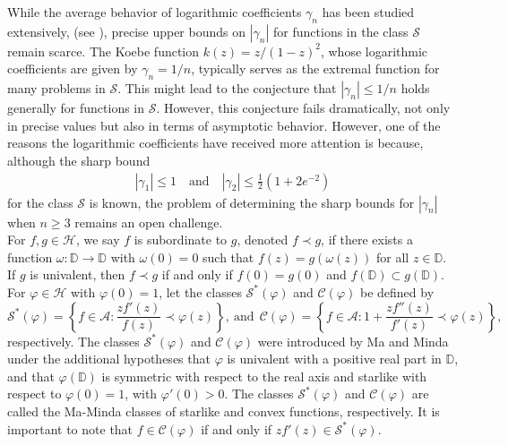 \documentclass[a4paper,12pt]{amsart}
\theoremstyle{definition}
\newcounter {own}
\begin{document}
While the average behavior of logarithmic coefficients $\gamma_n$ has been studied extensively, (see \cite{Ali-Vasudevarao-2018, 1979-Duren}), precise upper bounds on $|\gamma_n|$ for functions in the class $\mathcal{S}$ remain scarce. The Koebe function $k(z) = z/(1-z)^2$, whose logarithmic coefficients are given by $\gamma_n = 1/n$, typically serves as the extremal function for many problems in $\mathcal{S}$. This might lead to the conjecture that $|\gamma_n| \leq 1/n$ holds generally for functions in $\mathcal{S}$. However, this conjecture fails dramatically, not only in precise values but also in terms of asymptotic behavior.
However, one of the reasons the logarithmic coefficients have received more attention is because, although the sharp bound  
\begin{align*}
|\gamma_1|\le 1\quad \mathrm{and}\quad |\gamma_2|\le \frac{1}{2}\left(1+2 e^{-2}\right)
\end{align*}
for the class $\mathcal{S}$ is known, the problem of determining the sharp bounds for $|\gamma_n|$ when $n \ge 3$ remains an open challenge.\\



For $f, g \in \mathcal{H}$, we say $f$ is subordinate to $g$, denoted $f \prec g$, if there exists a function $\omega: \mathbb{D} \to \mathbb{D}$ with $\omega(0) = 0$ such that $f(z) = g(\omega(z))$ for all $z \in \mathbb{D}$. If $g$ is univalent, then $f \prec g$ if and only if $f(0) = g(0)$ and $f(\mathbb{D}) \subset g(\mathbb{D})$.
For \( \varphi \in \mathcal{H} \) with $\varphi(0)=1$, let the classes \( \mathcal{S}^*(\varphi) \) and $\mathcal{C}(\varphi)$ be defined by
$$
\mathcal{S}^*(\varphi) = \left\{ f \in \mathcal{A} : \frac{zf'(z)}{f(z)} \prec \varphi(z) \right\},~
\mathrm{and}~~
\mathcal{C}(\varphi) = \left\{ f \in \mathcal{A} : 1 + \frac{zf''(z)}{f'(z)} \prec \varphi(z) \right\},
$$
respectively. The classes $\mathcal{S}^*(\varphi)$ and $\mathcal{C}(\varphi)$ were introduced by Ma and Minda \cite{ma-minda-1992} under the additional hypotheses that $ \varphi $ is univalent with a positive real part in $ \mathbb{D} $, and that $ \varphi(\mathbb{D}) $ is symmetric with respect to the real axis and starlike with respect to $ \varphi(0) = 1 $, with $ \varphi'(0) > 0 $. The classes $ \mathcal{S}^*(\varphi) $ and $\mathcal{C}(\varphi)$ are called the Ma-Minda classes of starlike and convex functions, respectively. It is important to note that $ f \in \mathcal{C}(\varphi) $ if and only if $zf'(z) \in \mathcal{S}^*(\varphi)$.\\
\end{document}
